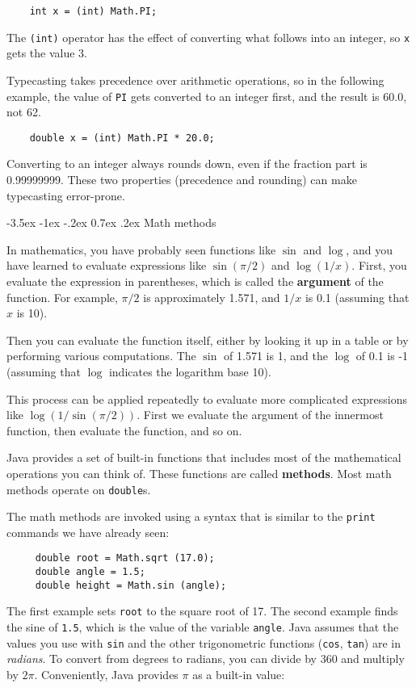 \documentclass{book}
\makeatletter
\renewcommand{\section}{\@startsection 
    {section} {1} {0mm}%
    {-3.5ex \@plus -1ex \@minus -.2ex}%
    {0.7ex \@plus.2ex}%
    {\normalfont\Large\bfseries}}
\makeatother
\begin{document}
\begin{verbatim}
    int x = (int) Math.PI;
\end{verbatim}
%
The {\tt (int)} operator has the effect of converting what
follows into an integer, so {\tt x} gets the value 3.

Typecasting takes precedence over arithmetic operations,
so in the following example, the value of {\tt PI} gets
converted to an integer first, and the result
is 60.0, not 62.

\begin{verbatim}
    double x = (int) Math.PI * 20.0;
\end{verbatim}
% 
Converting to an integer always rounds down, even if the fraction
part is 0.99999999.  These two properties (precedence and rounding)
can make typecasting error-prone.


\section{Math methods}

In mathematics, you have probably seen functions like $\sin$ and
$\log$, and you have learned to evaluate expressions like
$\sin(\pi/2)$ and $\log(1/x)$.  First, you evaluate the
expression in parentheses, which is called the {\bf argument} of the
function.  For example, $\pi/2$ is approximately 1.571, and $1/x$ is
0.1 (assuming that $x$ is 10).

Then you can evaluate the function itself, either by looking it up in
a table or by performing various computations.  The $\sin$ of 1.571 is
1, and the $\log$ of 0.1 is -1 (assuming that $\log$ indicates the
logarithm base 10).

This process can be applied repeatedly to evaluate more complicated
expressions like $\log(1/\sin(\pi/2))$.  First we evaluate the
argument of the innermost function, then evaluate the function,
and so on.

Java provides a set of built-in functions that includes most
of the mathematical operations you can think of.  These functions
are called {\bf methods}.  Most math methods operate on
{\tt double}s.

The math methods are invoked using a syntax that is similar to
the {\tt print} commands we have already seen:

\begin{verbatim}
     double root = Math.sqrt (17.0);
     double angle = 1.5;
     double height = Math.sin (angle);
\end{verbatim}
%
The first example sets {\tt root} to the square root of 17.
The second example finds the sine of {\tt 1.5}, which is the
value of the variable {\tt angle}.  Java assumes that the
values you use with {\tt sin} and the other trigonometric functions
({\tt cos}, {\tt tan}) are in {\em radians}.  To
convert from degrees to radians, you can divide by 360
and multiply by $2 \pi$.  Conveniently, Java provides $\pi$
as a built-in value:
\end{document}
